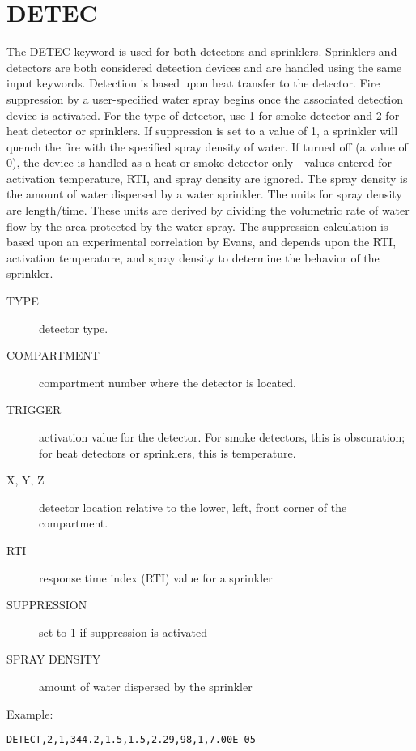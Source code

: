\section{DETEC}

The DETEC keyword is used for both detectors and sprinklers. Sprinklers and detectors are both considered detection devices and are handled using the same input keywords.  Detection is based upon heat transfer to the detector. Fire suppression by a user-specified water spray begins once the associated detection device is activated. For the type of detector, use 1 for smoke detector and 2 for heat detector or sprinklers. If suppression is set to a value of 1, a sprinkler will quench the fire with the specified spray density of water. If turned off (a value of 0), the device is handled as a heat or smoke detector only - values entered for activation temperature, RTI, and spray density are ignored. The spray density is the amount of water dispersed by a water sprinkler.  The units for spray density are length/time.  These units are derived by dividing the volumetric rate of water flow by the area protected by the water spray. The suppression calculation is based upon an experimental correlation by Evans, and depends upon the RTI, activation temperature, and spray density to determine the behavior of the sprinkler.
\begin{adjustwidth}{1cm}{0cm}
\begin{description}
  \item[TYPE] detector type.
  \item[COMPARTMENT] compartment number where the detector is located.
  \item[TRIGGER] activation value for the detector. For smoke detectors, this is obscuration; for heat detectors or sprinklers, this is temperature.
  \item[X, Y, Z] detector location relative to the lower, left, front corner of the compartment.
  \item[RTI] response time index (RTI) value for a sprinkler
  \item[SUPPRESSION] set to 1 if suppression is activated
  \item[SPRAY DENSITY] amount of water dispersed by the sprinkler
\end{description}
\end{adjustwidth}

\noindent Example:
\begin{lstlisting}
DETECT,2,1,344.2,1.5,1.5,2.29,98,1,7.00E-05
\end{lstlisting}

